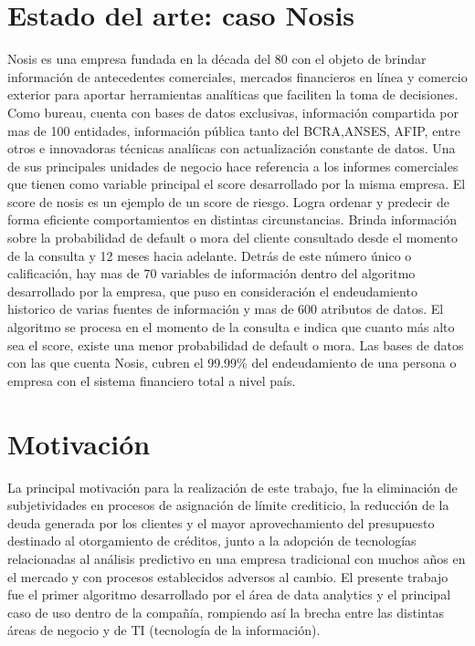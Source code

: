 \section{Estado del arte: caso Nosis}

Nosis es una empresa fundada en la década del 80 con el objeto de brindar información de antecedentes comerciales, 
mercados financieros en línea y comercio exterior para aportar herramientas analíticas que faciliten la toma de decisiones.
Como bureau, cuenta con bases de datos exclusivas, información compartida por mas de 100 entidades, información pública tanto del BCRA,ANSES, AFIP, entre otros  e innovadoras técnicas analíicas con actualización constante de datos. Una de sus principales unidades de negocio hace referencia a los informes comerciales que tienen como variable principal el score desarrollado por la misma empresa. El score de nosis es un ejemplo de un score de riesgo. Logra ordenar y predecir de forma eficiente comportamientos en distintas circunstancias. 
Brinda información sobre la probabilidad de default o mora del cliente consultado desde el momento de la consulta y 12 meses hacia adelante. Detrás de este número único o calificación, hay mas de 70 variables de información dentro del algoritmo desarrollado por la empresa, que puso en consideración el endeudamiento historico de varias fuentes de información y mas de 600 atributos de datos. El algoritmo se procesa en el momento de la consulta e indica que cuanto más alto sea el score, existe una menor probabilidad de default o mora.  
Las bases de datos con las que cuenta Nosis, cubren el 99.99\% del endeudamiento de una persona o empresa con el sistema financiero total a nivel país. 





\section{Motivación}


La principal motivación para la realización de este trabajo, fue la eliminación de subjetividades en procesos de asignación de límite crediticio, la reducción de la deuda generada por los clientes y el mayor aprovechamiento del presupuesto destinado al otorgamiento de créditos, junto a la adopción de tecnologías relacionadas al análisis predictivo en una empresa tradicional con muchos años en el mercado y con procesos establecidos adversos al cambio.
El presente trabajo fue el primer algoritmo desarrollado por el área de data analytics y el principal caso de uso dentro de la compañía, rompiendo así la brecha entre las distintas áreas de negocio y de TI (tecnología de la información).


